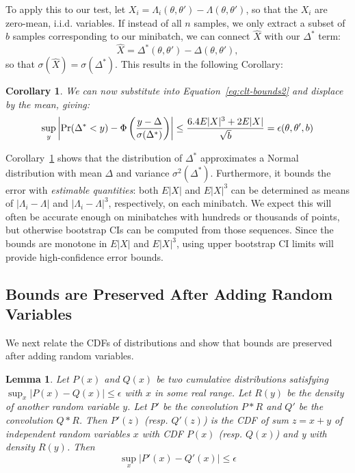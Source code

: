 \documentclass{article}
\newtheorem{lemma}{Lemma}
\newtheorem{corollary}{Corollary}
\begin{document}
To apply this to our test, let $X_i = \Lambda_i(\theta,\theta') -
\Lambda(\theta,\theta')$, so that the $X_i$ are zero-mean, i.i.d. variables. If
instead of all $n$ samples, we only extract a subset of $b$ samples
corresponding to our minibatch, we can connect $\hat{X}$ with our $\Delta^*$
term:
\begin{equation}\label{eq:x-hat}
    \hat{X} = \Delta^*(\theta,\theta') - \Delta(\theta,\theta'),
\end{equation}
so that $\sigma(\hat{X}) = \sigma(\Delta^*)$. This results in the following
Corollary:

\begin{corollary}\label{cor:our_bound_delta_prime}
We can now substitute into Equation~\ref{eq:clt-bounds2} and displace by the mean, giving:
\begin{equation}\label{eq:clt-bounds3}
    \sup_y\left|{\rm Pr}(\Delta^*< y) - \Phi\left(\frac{y-\Delta}{\sigma(\Delta^*)}\right)\right| \leq \frac{6.4E|X|^3+2E|X|}{\sqrt{b}} = \epsilon(\theta,\theta',b)
\end{equation}
\end{corollary}

Corollary~\ref{cor:our_bound_delta_prime} shows that the distribution of
$\Delta^*$ approximates a Normal distribution with mean $\Delta$ and variance
$\sigma^2(\Delta^*)$. Furthermore, it bounds the error with \emph{estimable
quantities}: both $E|X|$ and $E|X|^3$ can be determined as means of $|\Lambda_i
- \Lambda|$ and $|\Lambda_i - \Lambda|^3$, respectively, on each minibatch. We
expect this will often be accurate enough on minibatches with hundreds or
thousands of points, but otherwise bootstrap CIs can be computed from those
sequences. Since the bounds are monotone in $E|X|$ and $E|X|^3$, using upper
bootstrap CI limits will provide high-confidence error bounds.



\subsection{Bounds are Preserved After Adding Random Variables}\label{ssec:preserve_bounds}

We next relate the CDFs of distributions and show that bounds are preserved
after adding random variables.

\begin{lemma}\label{lem:cdf_bounds}
Let $P(x)$ and $Q(x)$ be two cumulative distributions satisfying
$\sup_x|P(x)-Q(x)|\leq \epsilon$ with $x$ in some real range. Let $R(y)$ be the
{\em density} of another random variable $y$. Let $P'$ be the convolution $P*R$
and $Q'$ be the convolution $Q*R$. Then $P'(z)$ (resp. $Q'(z)$) is the CDF of
sum $z=x+y$ of independent random variables $x$ with CDF $P(x)$ (resp. $Q(x)$)
and y with density $R(y)$.  Then
\begin{equation}
    \sup_x|P'(x)-Q'(x)|\leq \epsilon
\end{equation}
\end{lemma}
\end{document}

